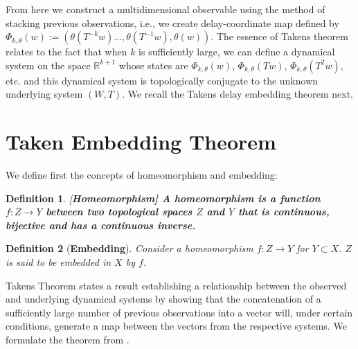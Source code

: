 \documentclass[a4paper,12pt,twoside]{report}
\newtheorem{Definition}{Definition}[]
\begin{document}
From here we construct a multidimensional observable using the method of stacking previous observations, i.e., we create delay-coordinate map defined by
$\Phi_{k,\theta}(w) := (\theta(T^{-k}w)\ldots,\theta(T^{-1}w),\theta(w))$.  The essence of Takens theorem relates to the fact that when $k$ is sufficiently large, we can define a dynamical system on the space $\mathbb{R}^{k+1}$ whose states are $\Phi_{k,\theta}(w)$, $\Phi_{k,\theta}(Tw)$, $\Phi_{k,\theta}(T^2w)$, etc. and this dynamical system is topologically conjugate to the unknown underlying system $(W,T)$. We recall the Takens delay embedding theorem next.



\section{Taken Embedding Theorem}

We define first the concepts of homeomorphism and embedding:
\begin{Definition}\rm
  [\bf {Homeomorphism}]\label{Dfn_homeo}\rm
  A homeomorphism is a function $f:Z\rightarrow Y$ between two topological spaces $Z$ and $Y$ that is continuous, bijective and has a continuous inverse. 
\end{Definition}

\begin{Definition}
  [\bf {Embedding}]\label{Dfn_embed}\rm
  Consider a homeomorphism $f:Z\rightarrow Y$ for $Y\subset X$. $Z$ is said to be embedded in $X$ by $f$.
\end{Definition}

Takens Theorem states a result establishing a relationship between the observed and underlying dynamical systems by showing that the concatenation of a sufficiently large number of previous observations into a vector will, under certain conditions, generate a map between the vectors from the respective systems.  We formulate the theorem from \cite{takens1981detecting}.  
\end{document}
